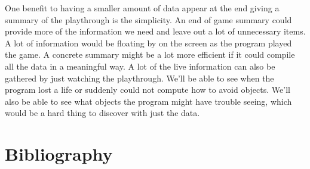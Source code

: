 \documentclass{scrreprt}
\begin{document}
One benefit to having a smaller amount of data appear at the end giving a summary of the playthrough is the simplicity.
An end of game summary could provide more of the information we need and leave out a lot of unnecessary items.
A lot of information would be floating by on the screen as the program played the game.
A concrete summary might be a lot more efficient if it could compile all the data in a meaningful way.
A lot of the live information can also be gathered by just watching the playthrough.
We'll be able to see when the program lost a life or suddenly could not compute how to avoid objects.
We'll also be able to see what objects the program might have trouble seeing, which would be a hard thing to discover with just the data.






\chapter{Bibliography}
\end{document}
